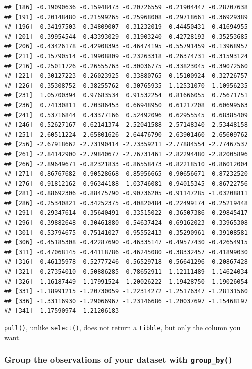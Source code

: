 \documentclass[]{gitbook}
\theoremstyle{definition}
\theoremstyle{definition}
\theoremstyle{definition}
\theoremstyle{remark}
\begin{document}
\begin{verbatim}
## [186] -0.19090636 -0.15948473 -0.20726559 -0.21904447 -0.28707638
## [191] -0.20148480 -0.21599265 -0.25968008 -0.29718661 -0.36929389
## [196] -0.34197503 -0.34809007 -0.31232019 -0.44450431 -0.41694955
## [201] -0.39954544 -0.43393029 -0.31903240 -0.42728193 -0.35253685
## [206] -0.43426178 -0.42908393 -0.46474195 -0.55791459 -0.13968957
## [211] -0.15790514 -0.19908809 -0.23263318 -0.26374731 -0.31593124
## [216] -0.25011726 -0.26555763 -0.30036775 -0.33823045 -0.39072560
## [221] -0.30127223 -0.26023925 -0.33880765 -0.15100924 -0.32726757
## [226] -0.35308752 -0.38255762 -0.30765935  1.12531070  1.10956235
## [231]  1.05700394  0.97683534  0.91532254  0.81666055  0.75671751
## [236]  0.74130811  0.70386453  0.66948950  0.61217208  0.60699563
## [241]  0.53716844  0.43377166  0.52492096  0.62955545  0.68385409
## [246]  0.52627167  0.62141374 -2.52041588 -2.57148340 -2.53448158
## [251] -2.60511224 -2.65801626 -2.64476790 -2.63901460 -2.65609762
## [256] -2.67918662 -2.73190414 -2.73359211 -2.77884554 -2.77467537
## [261] -2.84142900 -2.79840677 -2.76731461 -2.82294480 -2.82005896
## [266] -2.89649671 -0.82321833 -0.86558473 -0.82218510 -0.86012004
## [271] -0.86767682 -0.90528668 -0.85956665 -0.90656671 -0.87232520
## [276] -0.91812162 -0.96344188 -1.03746081 -0.94015345 -0.86722756
## [281] -0.88692306 -0.88475790 -0.90736205 -0.91147285 -1.03208811
## [286] -0.25340821 -0.34252375 -0.40820484 -0.22499174 -0.25219448
## [291] -0.29347614 -0.35640491 -0.33515022 -0.36507386 -0.29845417
## [296] -0.39882648 -0.30461880 -0.54637424 -0.69162023 -0.33965308
## [301] -0.53794675 -0.75141027 -0.95552413 -0.35290961 -0.39108581
## [306] -0.45185308 -0.42287690 -0.46335147 -0.49577430 -0.42654915
## [311] -0.47068145 -0.44118786 -0.46245080 -0.38332457 -0.41899030
## [316] -0.46135978 -0.52777246 -0.56529718 -0.56641296 -0.20867428
## [321] -0.27354010 -0.50886285 -0.78652911 -1.12111489 -1.14624034
## [326] -1.16187449 -1.17991524 -1.20026222 -1.19428750 -1.19026054
## [331] -1.18991215 -1.20730059 -1.22314272 -1.25176347 -1.28131560
## [336] -1.33116930 -1.29066967 -1.23146686 -1.20037697 -1.15468197
## [341] -1.17590974 -1.21206183
\end{verbatim}

\texttt{pull()}, unlike \texttt{select()}, does not return a
\texttt{tibble}, but only the column you want.

\hypertarget{group-the-observations-of-your-dataset-with-group_by}{%
\subsubsection{\texorpdfstring{Group the observations of your dataset
with
\texttt{group\_by()}}{Group the observations of your dataset with group\_by()}}\label{group-the-observations-of-your-dataset-with-group_by}}
\end{document}
